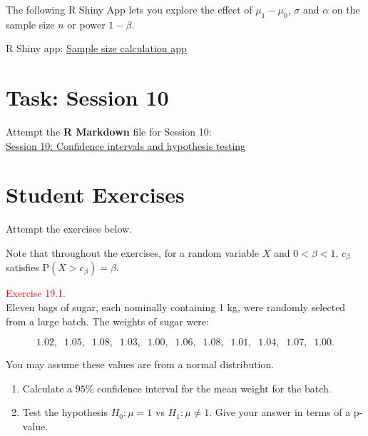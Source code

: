 \documentclass[
]{book}
\providecommand{\tightlist}{%
  \setlength{\itemsep}{0pt}\setlength{\parskip}{0pt}}
\begin{document}
The following R Shiny App lets you explore the effect of \(\mu_1 - \mu_0\), \(\sigma\) and \(\alpha\) on the sample size \(n\) or power \(1-\beta\).

R Shiny app: \href{https://shiny-new.maths.nottingham.ac.uk/pmzpn/SampleSize/}{Sample size calculation app}

\hypertarget{Sec_Hypo_Test:lab}{%
\section*{\texorpdfstring{{\textbf{Task: Session 10}}}{Task: Session 10}}\label{Sec_Hypo_Test:lab}}

Attempt the \textbf{R Markdown} file for Session 10:\\
\href{https://moodle.nottingham.ac.uk/course/view.php?id=134982\#section-2}{Session 10: Confidence intervals and hypothesis testing}

\hypertarget{Sec_Hypo_Test:exer}{%
\section*{\texorpdfstring{{\textbf{Student Exercises}}}{Student Exercises}}\label{Sec_Hypo_Test:exer}}

Attempt the exercises below.

Note that throughout the exercises, for a random variable \(X\) and \(0 <\beta <1\), \(c_\beta\) satisfies \(\mathrm{P} (X > c_\beta) = \beta\).

\hypertarget{exer19.1}{}
\textcolor{red}{Exercise 19.1.}\\
Eleven bags of sugar, each nominally containing 1 kg, were randomly selected from a large batch. The weights of sugar were:

\[ 1.02, \; \; 1.05, \; \; 1.08, \; \; 1.03, \; \; 1.00, \; \; 1.06, \; \; 1.08, \; \; 1.01, \; \; 1.04, \; \; 1.07, \; \; 1.00. \]

You may assume these values are from a normal distribution.

\begin{enumerate}
\def\labelenumi{(\alph{enumi})}
\tightlist
\item
  Calculate a \(95\%\) confidence interval for the mean weight for the batch.\\
\item
  Test the hypothesis \(H_0: \mu=1\) vs \(H_1: \mu \neq 1\). Give your answer in terms of a p-value.
\end{enumerate}
\end{document}
